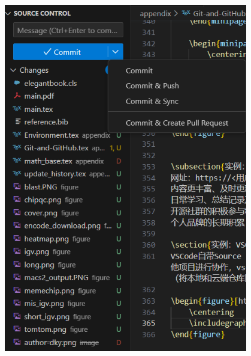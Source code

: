 \begin{figure}[ht]
\begin{minipage}[c]{0.35\textwidth}
        \includegraphics[width=0.95\textwidth]{image/git/github-source-con2.png}
    \end{minipage}
    \begin{minipage}[c]{0.2\textwidth}
        \centering

\end{minipage}
\end{figure}
